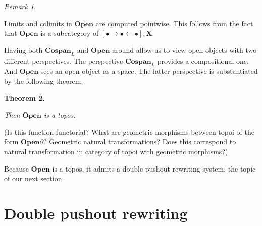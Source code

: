 \documentclass{amsart}
\newcommand{\X}{\cat{X}}
\newcommand{\cat}[1]{\mathbf{#1}}
\newcommand{\Cospan}{\mathbf{Cospan}}
\newcommand{\OpenOb}{\mathbf{Open} }
\newcommand{\edit}[1]{\textcolor{editcolour}{(#1)}}
\newenvironment{exposition}[1]{}{}
\newtheorem{theorem}{Theorem}[section]
\theoremstyle{remark}
\newtheorem{remark}[theorem]{Remark}
\theoremstyle{definition}
\begin{document}
\begin{remark}
  \label{thm:open-obj-ptwise-limits}

  Limits and colimits in \( \OpenOb \) are computed pointwise. This
  follows from the fact that \( \OpenOb \) is a subcategory of \(
  \left[ \bullet \to \bullet \gets \bullet \right] , \X \).   
  
\end{remark}


\begin{exposition}{}
  
  Having both $ \Cospan_L $ and $ \OpenOb $ around
  allow us to view open objects with two different perspectives.
  The perspective \( \Cospan_L \) provides a compositional one. And \(
  \OpenOb \) sees an open object as a space. The latter perspective is
  substantiated by the following theorem.
  
\end{exposition}

\begin{theorem}
  \label{thm:OpenObTopos}

  Then $ \OpenOb $ is a topos.
  
\end{theorem}

\edit{Is this function functorial?  What are geometric morphisms
  between topoi of the form $ \OpenOb{\partial} $?  Geometric natural
  transformations?  Does this correspond to natural transformation in
  category of topoi with geometric morphisms?}

\begin{exposition}{}

  Because $ \OpenOb $ is a topos, it admits a double
  pushout rewriting system, the topic of our next section.

\end{exposition}


\section{Double pushout rewriting}
\label{sec:double-push-rewr}

  
\end{document}
